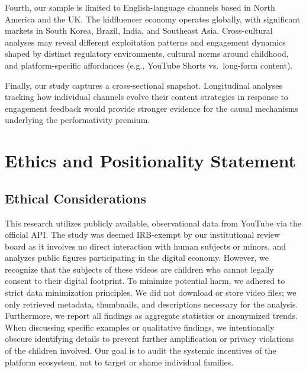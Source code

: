\documentclass[letterpaper]{article} %
\begin{document}
Fourth, our sample is limited to English-language channels based in North America and the UK. The kidfluencer economy operates globally, with significant markets in South Korea, Brazil, India, and Southeast Asia. Cross-cultural analyses may reveal different exploitation patterns and engagement dynamics shaped by distinct regulatory environments, cultural norms around childhood, and platform-specific affordances (e.g., YouTube Shorts vs.\ long-form content).

Finally, our study captures a cross-sectional snapshot. Longitudinal analyses tracking how individual channels evolve their content strategies in response to engagement feedback would provide stronger evidence for the causal mechanisms underlying the performativity premium.

\section{Ethics and Positionality Statement}

\subsection{Ethical Considerations}
This research utilizes publicly available, observational data from YouTube via the official API. The study was deemed IRB-exempt by our institutional review board as it involves no direct interaction with human subjects or minors, and analyzes public figures participating in the digital economy. However, we recognize that the subjects of these videos are children who cannot legally consent to their digital footprint. To minimize potential harm, we adhered to strict data minimization principles. We did not download or store video files; we only retrieved metadata, thumbnails, and descriptions necessary for the analysis. Furthermore, we report all findings as aggregate statistics or anonymized trends. When discussing specific examples or qualitative findings, we intentionally obscure identifying details to prevent further amplification or privacy violations of the children involved. Our goal is to audit the systemic incentives of the platform ecosystem, not to target or shame individual families.
\end{document}
